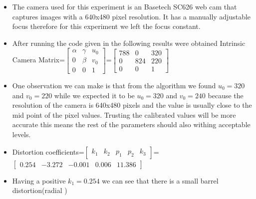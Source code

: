    \begin{itemize}
       \item The camera used for this experiment is an Basetech SC626 web cam that captures images with a 640x480 pixel resolution. It has a manually adjustable focus therefore for this experiment we left the focus constant.
       
       \item After running the code given in  the following results were obtained
       \vspace{10px}
       \newline
           Intrinsic Camera Matrix=$\begin{bmatrix} \alpha & \gamma & u_0 \\ 
                                    0 & \beta & v_0       \\ 
                                    0 & 0& 1
                    \end{bmatrix}$=$\begin{bmatrix}788 & 0& 320\\0 &824 & 220\\ 0 & 0 &1
                                    \end{bmatrix}$
                                    
                                    
        \item One observation we can make is that from the algorithm we found $u_0=320$ and $v_0=220$ while we expected it to be $u_0=320$ and $v_0=240$ because the resolution of the camera is 640x480 pixels and the value is usually close to the mid point of the pixel values. Trusting the calibrated values will be more accurate this means the rest of the parameters should also withing acceptable levels.
                                    
        \item Distortion coefficients=$\begin{bmatrix}k_1 & k_2& p_1& p_2&             k_3\end{bmatrix}$=$\begin{bmatrix}0.254 & -3.272 & -0.001 & 0.006 & 11.386
                            \end{bmatrix}$
                            
        \item Having a positive $k_1=0.254$ we can see that there is a small barrel distortion(radial )
                            

\end{itemize}
